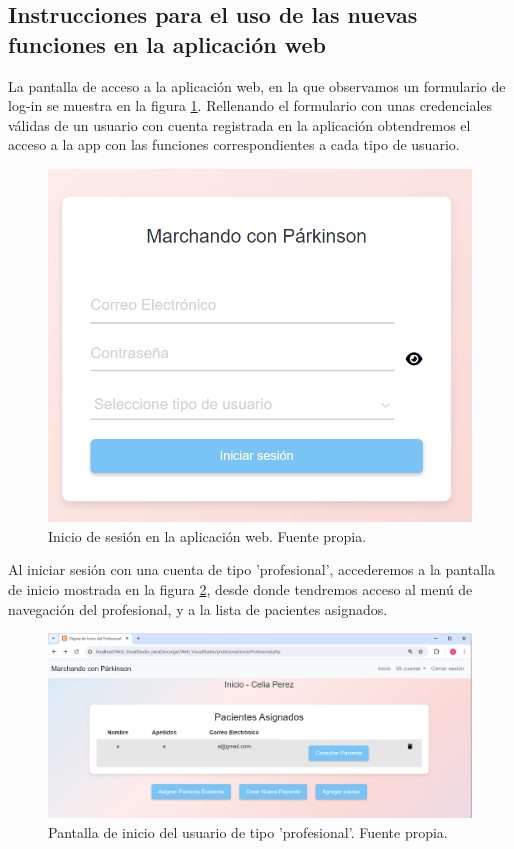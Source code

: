 \subsection{Instrucciones para el uso de las nuevas funciones en la aplicación web}
La pantalla de acceso a la aplicación web, en la que observamos un formulario de log-in se muestra en la figura \ref{fig:inicio}. Rellenando el formulario con unas credenciales válidas de un usuario con cuenta registrada en la aplicación obtendremos el acceso a la app con las funciones correspondientes a cada tipo de usuario.
\begin{figure}[h]
    \centering
    \includegraphics[width=1\textwidth]{img/inicio.png}
    \caption{Inicio de sesión en la aplicación web. Fuente propia.}
    \label{fig:inicio}
\end{figure}
Al iniciar sesión con una cuenta de tipo 'profesional', accederemos a la pantalla de inicio mostrada en la figura \ref{fig:inicioprof}, desde donde tendremos acceso al menú de navegación del profesional, y a la lista de pacientes asignados. 
\begin{figure}[h]
    \centering
    \includegraphics[width=1\textwidth]{img/inicioprof.png}
    \caption{Pantalla de inicio del usuario de tipo 'profesional'. Fuente propia.}
    \label{fig:inicioprof}
\end{figure}

